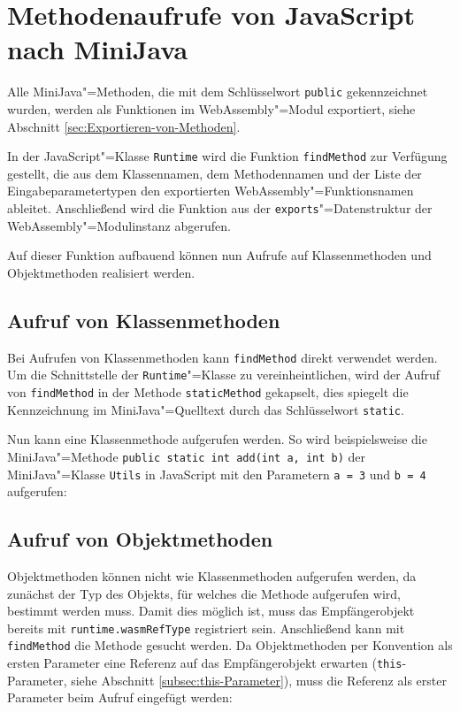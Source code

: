 \section{Methodenaufrufe von JavaScript nach MiniJava}

Alle MiniJava"=Methoden, die mit dem Schlüsselwort \lstinline{public} gekennzeichnet wurden, werden als Funktionen im WebAssembly"=Modul exportiert, siehe Abschnitt \ref{sec:Exportieren-von-Methoden}.

In der JavaScript"=Klasse \lstinline{Runtime} wird die Funktion \lstinline{findMethod} zur Verfügung gestellt, die aus dem Klassennamen, dem Methodennamen und der Liste der Eingabeparametertypen den exportierten WebAssembly"=Funktionsnamen ableitet. Anschließend wird die Funktion aus der \lstinline{exports}"=Datenstruktur der WebAssembly"=Modulinstanz abgerufen.

\pagebreak


Auf dieser Funktion aufbauend können nun Aufrufe auf Klassenmethoden und Objektmethoden realisiert werden.

\subsection{Aufruf von Klassenmethoden}

Bei Aufrufen von Klassenmethoden kann \lstinline{findMethod} direkt verwendet werden. Um die Schnittstelle der \lstinline{Runtime}"=Klasse zu vereinheintlichen, wird der Aufruf von \lstinline{findMethod} in der Methode \lstinline{staticMethod} gekapselt, dies spiegelt die Kennzeichnung im MiniJava"=Quelltext durch das Schlüsselwort \lstinline{static}.



Nun kann eine Klassenmethode aufgerufen werden. So wird beispielsweise die MiniJava"=Methode \lstinline{public static int add(int a, int b)} der MiniJava"=Klasse \lstinline{Utils} in JavaScript mit den Parametern \lstinline{a = 3} und \lstinline{b = 4} aufgerufen:



\subsection{Aufruf von Objektmethoden}

Objektmethoden können nicht wie Klassenmethoden aufgerufen werden, da zunächst der Typ des Objekts, für welches die Methode aufgerufen wird, bestimmt werden muss. Damit dies möglich ist, muss das Empfängerobjekt bereits mit \lstinline{runtime.wasmRefType} registriert sein. Anschließend kann mit \lstinline{findMethod} die Methode gesucht werden. Da Objektmethoden per Konvention als ersten Parameter eine Referenz auf das Empfängerobjekt erwarten (\lstinline{this}-Parameter, siehe Abschnitt \ref{subsec:this-Parameter}), muss die Referenz als erster Parameter beim Aufruf eingefügt werden:

